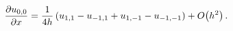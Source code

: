 \[\frac{\partial u_{0,0}}{\partial x}=\frac{1}{4h}\,(u_{1,1}-u_{-1,1}+u_{1,-1}-u%
_{-1,-1})+\mathop{O\/}\nolimits\!\left(h^{2}\right).\]